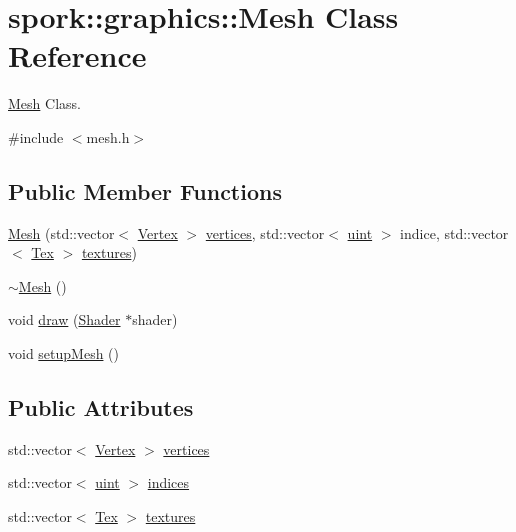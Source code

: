 \hypertarget{classspork_1_1graphics_1_1_mesh}{}\section{spork\+:\+:graphics\+:\+:Mesh Class Reference}
\label{classspork_1_1graphics_1_1_mesh}


\hyperlink{classspork_1_1graphics_1_1_mesh}{Mesh} Class.  




{\ttfamily \#include $<$mesh.\+h$>$}

\subsection*{Public Member Functions}
\begin{DoxyCompactItemize}
\item 
\hyperlink{classspork_1_1graphics_1_1_mesh_a72d87fa982dcad754e9993457a95724b}{Mesh} (std\+::vector$<$ \hyperlink{structspork_1_1graphics_1_1_vertex}{Vertex} $>$ \hyperlink{classspork_1_1graphics_1_1_mesh_ae2f135b00a81366187383271ebeb836e}{vertices}, std\+::vector$<$ \hyperlink{defines_8h_a91ad9478d81a7aaf2593e8d9c3d06a14}{uint} $>$ indice, std\+::vector$<$ \hyperlink{structspork_1_1graphics_1_1_tex}{Tex} $>$ \hyperlink{classspork_1_1graphics_1_1_mesh_a2bfa767192b6622231e3aeeeea9ba119}{textures})
\item 
\hyperlink{classspork_1_1graphics_1_1_mesh_a995f42dd58db38b472170d8082dc538b}{$\sim$\+Mesh} ()
\item 
void \hyperlink{classspork_1_1graphics_1_1_mesh_aa6cd194da090d5436f89524fc8332e46}{draw} (\hyperlink{classspork_1_1graphics_1_1_shader}{Shader} $\ast$shader)
\item 
void \hyperlink{classspork_1_1graphics_1_1_mesh_af92ddf7ba47ffa22739ba031dc71ebfa}{setup\+Mesh} ()
\end{DoxyCompactItemize}
\subsection*{Public Attributes}
\begin{DoxyCompactItemize}
\item 
std\+::vector$<$ \hyperlink{structspork_1_1graphics_1_1_vertex}{Vertex} $>$ \hyperlink{classspork_1_1graphics_1_1_mesh_ae2f135b00a81366187383271ebeb836e}{vertices}
\item 
std\+::vector$<$ \hyperlink{defines_8h_a91ad9478d81a7aaf2593e8d9c3d06a14}{uint} $>$ \hyperlink{classspork_1_1graphics_1_1_mesh_aaf3d3748786e2faff3cee404497853ff}{indices}
\item 
std\+::vector$<$ \hyperlink{structspork_1_1graphics_1_1_tex}{Tex} $>$ \hyperlink{classspork_1_1graphics_1_1_mesh_a2bfa767192b6622231e3aeeeea9ba119}{textures}
\end{DoxyCompactItemize}
